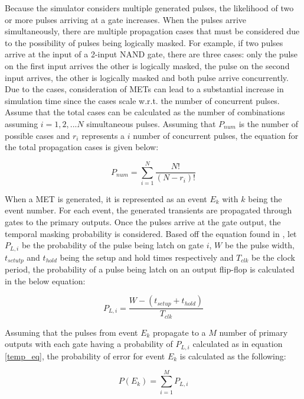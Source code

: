 \documentclass[conference]{IEEEtran}
\begin{document}
Because the simulator considers multiple generated pulses, the likelihood of two or more pulses arriving at a gate increases. When the pulses arrive simultaneously, there are multiple propagation cases that must be considered due to the possibility of pulses being logically masked. For example, if two pulses arrive at the input of a 2-input NAND gate, there are three cases: only the pulse on the first input arrives the other is logically masked, the pulse on the second input arrives, the other is logically masked and both pulse arrive concurrently. Due to the cases, consideration of METs can lead to a substantial increase in simulation time since the cases scale w.r.t. the number of concurrent pulses. Assume that the total cases can be calculated as the number of combinations assuming $i = 1,2,...N$ simultaneous pulses. Assuming that $P_{num}$ is the number of possible cases and $r_i$ represents a $i$ number of concurrent pulses, the equation for the total propagation cases is given below:

\begin{equation} \label{prop_num}
P_{num} = \sum_{i=1}^{N} \frac{N!}{(N-r_i)!}
\end{equation} 

When a MET is generated, it is represented as an event $E_k$ with $k$ being the event number. For each event, the generated transients are propagated through gates to the primary outputs. Once the pulses arrive at the gate output, the temporal masking probability is considered. Based off the equation found in \cite{Omana_Trap}, let  $P_{L,i}$ be the probability of the pulse being latch on gate $i$, $W$ be the pulse width, $t_{setutp}$ and $t_{hold}$ being the setup and hold times respectively and $T_{clk}$ be the clock period, the probability of a pulse being latch on an output flip-flop is calculated in the below equation:

\begin{equation} \label{temp_eq}
P_{L,i} = \frac{W - (t_{setup} + t_{hold})}{T_{clk}}
\end{equation}

Assuming that the pulses from event $E_k$ propagate to a $M$ number of primary outputs with each gate having a probability of $P_{L,i}$ calculated as in equation \ref{temp_eq}, the probability of error for event $E_k$ is calculated as the following:  

\begin{equation} \label{event_eq}
P(E_k) = \sum_{i=1}^{M} P_{L,i}
\end{equation}
\end{document}

